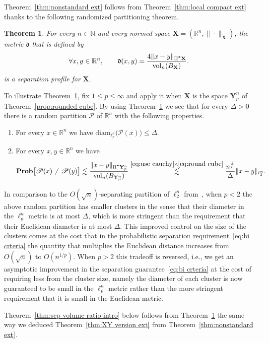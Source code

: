 \documentclass[11pt,reqno]{amsart}
\renewcommand{\le}{\leqslant}
\newcommand{\diam}{\mathrm{diam}}
\newcommand{\X}{\mathbf X}
\newcommand{\Y}{\mathbf Y}
\newcommand{\R}{\mathbb R}
\newtheorem{theorem}{Theorem}
\theoremstyle{remark}
\newcommand{\N}{\mathbb N}
\renewcommand{\Pr}{\mathbf{Prob}}
\newcommand{\vol}{\mathrm{vol}}
\renewcommand{\1}{\mathbf 1}
\newcommand{\Part}{\mathscr{P}}
\begin{document}
Theorem~\ref{thm:nonstandard ext}  follows from Theorem~\ref{thm:local compact ext} thanks to the following randomized partitioning theorem.

\begin{theorem}\label{thm:mixed extension}
For every $n\in \N$ and every normed space $\X=(\R^n,\|\cdot\|_\X)$, the metric $\mathfrak{d}$ that is defined by
$$
\forall x,y\in \R^n,\qquad \mathfrak{d}(x,y)=\frac{4\|x-y\|_{\Pi^{\textbf *}\X}}{\vol_n(B_\X)}.
$$
is a separation profile for $\X$.
\end{theorem}


To illustrate  Theorem~\ref{thm:mixed extension}, fix $1\le p\le\infty$ and apply it when $\X$ is  the space $\Y_p^n$ of Theorem~\ref{prop:rounded cube}. By using Theorem~\ref{thm:mixed extension}  we see that for every $\Delta>0$ there is a random partition $\Part$ of $\R^n$ with the following properties.
\begin{enumerate}%
\item For every $x\in \R^n$ we have $\diam_{\ell_p^n}\big(\mathscr{P}(x)\big)\le \Delta$.
\item For every $x,y\in \R^n$ we have
\begin{equation}\label{eq:bi crteria}
\Pr \big[\mathscr{P}(x)\neq \mathscr{P}(y)\big]\lesssim \frac{\|x-y\|_{\Pi^{\textbf *}\Y_p^n}}{\vol_n(B_{\Y_p^n})}\stackrel{\eqref{eq:use cauchy} \wedge\eqref{eq:round cube}}{\lesssim}  \frac{n^{\frac{1}{p}}}{\Delta} \|x-y\|_{\ell_2^n}.
\end{equation}
\end{enumerate}
In comparison to the $O(\sqrt{n})$-separating partition of $\ell_2^n$ from~\cite{CCGGP98}, when $p<2$ the above random partition  has  smaller clusters in the sense that their diameter in the $\ell_p^n$ metric is at most $\Delta$, which is more stringent than the requirement that their Euclidean diameter is at most $\Delta$. This improved control on the size of the clusters comes at the cost that in the probabilistic separation requirement~\eqref{eq:bi crteria} the quantity that multiplies the Euclidean distance increases from $O(\sqrt{n})$ to $O(n^{1/p})$. When $p>2$ this tradeoff is reversed, i.e., we get an asymptotic improvement in the separation guarantee~\eqref{eq:bi crteria}  at the cost of requiring less from the cluster size, namely the diameter of each cluster is now guaranteed to be small in the $\ell_p^n$ metric rather than the more stringent requirement that it is small in the Euclidean metric.

Theorem~\ref{thm:sep volume ratio-intro} below  follows from   Theorem~\ref{thm:mixed extension} the same way we deduced Theorem~\ref{thm:XY version ext} from Theorem~\ref{thm:nonstandard ext}.
\end{document}

